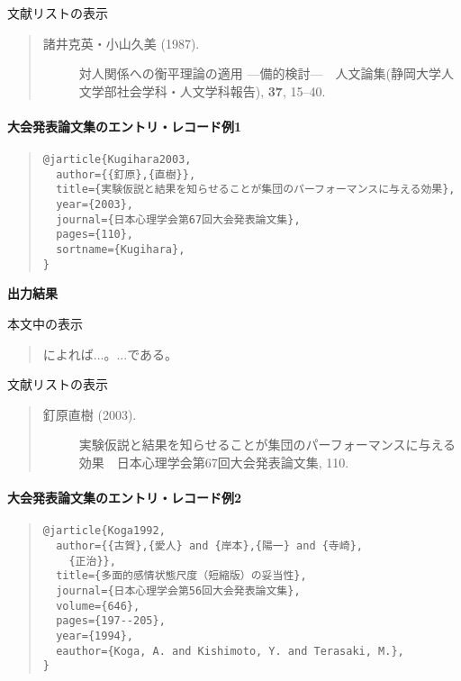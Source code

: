 \documentclass[12pt]{ltjsarticle}
\begin{document}
文献リストの表示
\begin{quote}
\begin{description}
  \item[\textrm{諸井克英・小山久美 (1987).}]対人関係への衡平理論の適用 ---備的検討---　人文論集(静岡大学人文学部社会学科・人文学科報告), \textbf{37}, 15--40.
\end{description}
\end{quote}

\paragraph{大会発表論文集のエントリ・レコード例1}

\begin{quote}
\begin{verbatim}
@jarticle{Kugihara2003,
  author={{釘原},{直樹}},
  title={実験仮説と結果を知らせることが集団のパーフォーマンスに与える効果},
  year={2003},
  journal={日本心理学会第67回大会発表論文集},
  pages={110},
  sortname={Kugihara},
}
\end{verbatim}
\end{quote}


\textbf{出力結果}

本文中の表示
\begin{quote}
\textcite{Kugihara2003}によれば...。...である\parencite{Kugihara2003}。
\end{quote}


文献リストの表示
\begin{quote}
\begin{description}
  \item[\textrm{釘原直樹 (2003).}]実験仮説と結果を知らせることが集団のパーフォーマンスに与える効果　日本心理学会第67回大会発表論文集, 110.
\end{description}
\end{quote}

\paragraph{大会発表論文集のエントリ・レコード例2}

\begin{quote}
\begin{verbatim}
@jarticle{Koga1992,
  author={{古賀},{愛人} and {岸本},{陽一} and {寺崎},
    {正治}},
  title={多面的感情状態尺度（短縮版）の妥当性},
  journal={日本心理学会第56回大会発表論文集},
  volume={646},
  pages={197--205},
  year={1994},
  eauthor={Koga, A. and Kishimoto, Y. and Terasaki, M.},
}
\end{verbatim}
\end{quote}
\end{document}
